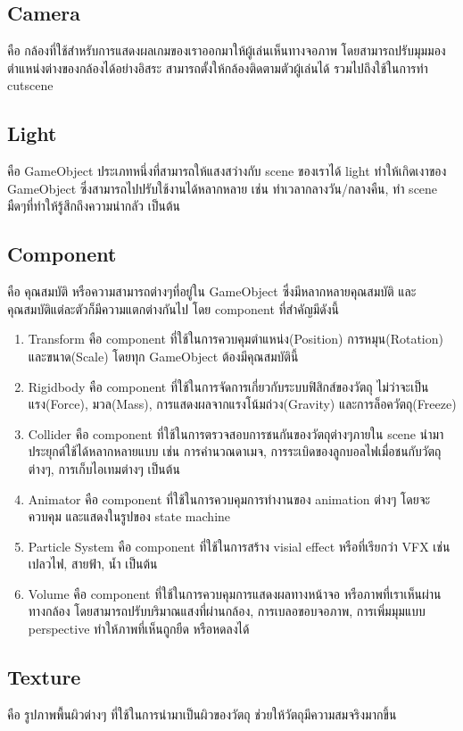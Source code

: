 \subsection{Camera}
คือ กล้องที่ใช้สำหรับการแสดงผลเกมของเราออกมาให้ผู้เล่นเห็นทางจอภาพ โดยสามารถปรับมุมมอง ตำแหน่งต่างของกล้องได้อย่างอิสระ 
สามารถตั้งให้กล้องติดตามตัวผู้เล่นได้ รวมไปถึงใช้ในการทำ cutscene
\subsection{Light}
คือ GameObject ประเภทหนึ่งที่สามารถให้แสงสว่างกับ scene ของเราได้ light ทำให้เกิดเงาของ GameObject 
ซึ่งสามารถไปปรับใช้งานได้หลากหลาย เช่น ทำเวลากลางวัน/กลางคืน, ทำ scene มืดๆที่ทำให้รู้สึกถึงความน่ากลัว เป็นต้น
\subsection{Component}
คือ คุณสมบัติ หรือความสามารถต่างๆที่อยู่ใน GameObject ซึ่งมีหลากหลายคุณสมบัติ และคุณสมบัติแต่ละตัวก็มีความแตกต่างกันไป
โดย component ที่สำคัญมีดังนี้ 

\begin{enumerate}
\item Transform คือ component ที่ใช้ในการควบคุมตำแหน่ง(Position) การหมุน(Rotation) และขนาด(Scale) 
โดยทุก GameObject ต้องมีคุณสมบัตินี้
\item Rigidbody คือ component ที่ใช้ในการจัดการเกี่ยวกับระบบฟิสิกส์ของวัตถุ ไม่ว่าจะเป็น แรง(Force), มวล(Mass), 
การแสดงผลจากแรงโน้มถ่วง(Gravity) และการล็อควัตถุ(Freeze)
\item Collider คือ component ที่ใช้ในการตรวจสอบการชนกันของวัตถุต่างๆภายใน scene นำมาประยุกต์ใช้ได้หลากหลายแบบ
เช่น การคำนวณดาเมจ, การระเบิดของลูกบอลไฟเมื่อชนกับวัตถุต่างๆ, การเก็บไอเทมต่างๆ เป็นต้น
\item Animator คือ component ที่ใช้ในการควบคุมการทำงานของ animation ต่างๆ โดยจะควบคุม และแสดงในรูปของ state machine
\item Particle System คือ component ที่ใช้ในการสร้าง visial effect หรือที่เรียกว่า VFX เช่น เปลวไฟ, สายฟ้า, น้ำ เป็นต้น
\item Volume คือ component ที่ใช้ในการควบคุมการแสดงผลทางหน้าจอ หรือภาพที่เราเห็นผ่านทางกล้อง โดยสามารถปรับบริมาณแสงที่ผ่านกล้อง, 
การเบลอขอบจอภาพ, การเพิ่มมุมแบบ perspective ทำให้ภาพที่เห็นถูกยืด หรือหดลงได้
\end{enumerate}

\subsection{Texture}
คือ รูปภาพพื้นผิวต่างๆ ที่ใช้ในการนำมาเป็นผิวของวัตถุ ช่วยให้วัตถุมีความสมจริงมากขึ้น
